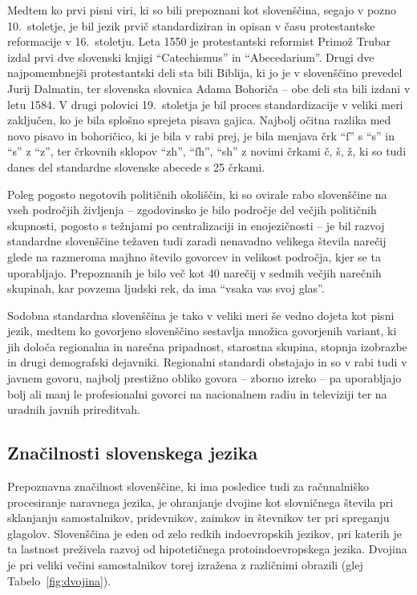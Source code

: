 \begin{multicols}{2}
Medtem ko prvi pisni viri, ki so bili prepoznani kot slovenščina, segajo v pozno 10.~stoletje, je bil jezik prvič standardiziran in opisan v času protestantske reformacije v 16.~stoletju. Leta 1550 je protestantski reformist Primož Trubar izdal prvi dve slovenski knji\-gi “Catechismus” in “Abecedarium”. Drugi dve naj\-pomembnejši protestantski deli sta bili Biblija, ki jo je v slovenščino prevedel Jurij Dalmatin, ter slovenska slovnica Adama Bohoriča – obe deli sta bili izdani v letu 1584. 
V drugi polovici 19.~stoletja je bil proces standardizacije v veliki meri zaključen, ko je bila splošno sprejeta pisava gajica. Naj\-bolj očitna razlika med novo pisavo in bohoričico, ki je bila v rabi prej, je bila menjava črk “ſ” s “s” in “s” z “z”, ter črkovnih sklopov “zh”, “ſh”, “sh” z novimi črkami č, š, ž, ki so tudi danes del standardne slovenske abecede s 25 črkami.

Poleg pogosto negotovih političnih okoliščin, ki so ovirale rabo slovenščine na vseh področjih živ\-ljenja – zgodovinsko je bilo področje del večjih političnih skupnosti, pogosto s težnjami po centra\-lizaciji in enojezičnosti – je bil razvoj standardne slovenščine težaven tudi zaradi nenavadno velikega števila narečij glede na razmeroma majhno število go\-vorcev in velikost področja, kjer se ta uporab\-ljajo. Prepoznanih je bilo več kot 40 narečij v sedmih večjih narečnih skupinah, kar povzema ljudski rek, da ima “vsaka vas svoj glas”. 


Sodobna standardna slovenščina je tako v veliki meri še vedno dojeta kot pisni jezik, medtem ko go\-vorjeno slovenščino sestav\-lja množica go\-vorjenih variant, ki jih določa regionalna in narečna pripadnost, starostna skupina, stopnja izobrazbe in drugi demografski dejavniki. Regionalni standardi obstajajo in so v rabi tudi v javnem go\-voru, naj\-bolj prestižno obliko go\-vora – zborno izreko – pa uporab\-ljajo bolj ali manj le profesionalni go\-vorci na nacionalnem radiu in televiziji ter na uradnih javnih prireditvah. 

\subsection{Značilnosti slovenskega jezika}

Prepoznavna značilnost slovenščine, ki ima posledice tudi za računalniško procesiranje narav\-nega jezika, je ohranjanje dvojine kot slovničnega števila pri sklanjanju samostalnikov, pridevnikov, zaimkov in števnikov ter pri spreganju glagolov. Slovenščina je eden od zelo redkih indoevropskih jezikov, pri katerih je ta lastnost preživela razvoj od hipotetičnega protoindoevropskega jezika. Dvojina je pri veliki večini samostalnikov torej izražena z različnimi obrazili (glej Tabelo~\ref{fig:dvojina}).


\end{multicols}
